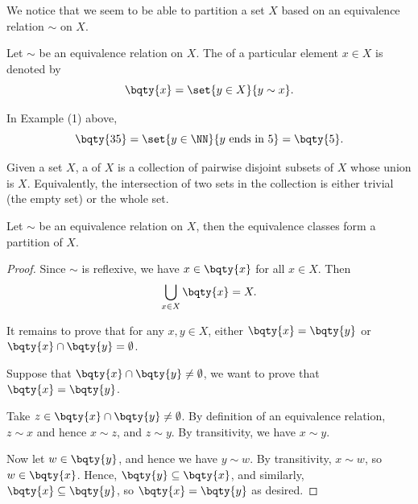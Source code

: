 We notice that we seem to be able to partition a set \(X\) based on an equivalence relation \(\sim\) on \(X\).

\begin{definition}
    Let \(\sim\) be an equivalence relation on \(X\). The  of a particular element \(x \in X\) is denoted by
    \[
        \bqty{x} = \set{y \in X}{y \sim x}.
    \]
\end{definition}

\begin{example}
    In Example (1) above,
    \[
        \bqty{35} = \set{y \in \NN}{y\text{ ends in }5} = \bqty{5}.
    \]
\end{example}

\begin{definition}[Partition]
    Given a set \(X\), a  of \(X\) is a collection of pairwise disjoint subsets of \(X\) whose union is \(X\). Equivalently, the intersection of two sets in the collection is either trivial (the empty set) or the whole set.
\end{definition}

\begin{theorem}
    Let \(\sim\) be an equivalence relation on \(X\), then the equivalence classes form a partition of \(X\).
\end{theorem}

\begin{proof}
    Since \(\sim\) is reflexive, we have \(x \in \bqty{x}\) for all \(x \in X\). Then
    \[
        \bigcup_{x \in X} \bqty{x} = X.
    \]

    It remains to prove that for any \(x, y \in X\), either \(\bqty{x} = \bqty{y}\) or \(\bqty{x} \cap \bqty{y} = \emptyset\).

    Suppose that \(\bqty{x} \cap \bqty{y} \neq \emptyset\), we want to prove that \(\bqty{x} = \bqty{y}\).
    
    Take \(z \in \bqty{x} \cap \bqty{y} \neq \emptyset\). By definition of an equivalence relation, \(z \sim x\) and hence \(x \sim z\), and \(z \sim y\). By transitivity, we have \(x \sim y\).

    Now let \(w \in \bqty{y}\), and hence we have \(y \sim w\). By transitivity, \(x \sim w\), so \(w \in \bqty{x}\). Hence, \(\bqty{y} \subseteq \bqty{x}\), and similarly, \(\bqty{x} \subseteq \bqty{y}\), so \(\bqty{x} = \bqty{y}\) as desired.
\end{proof}

